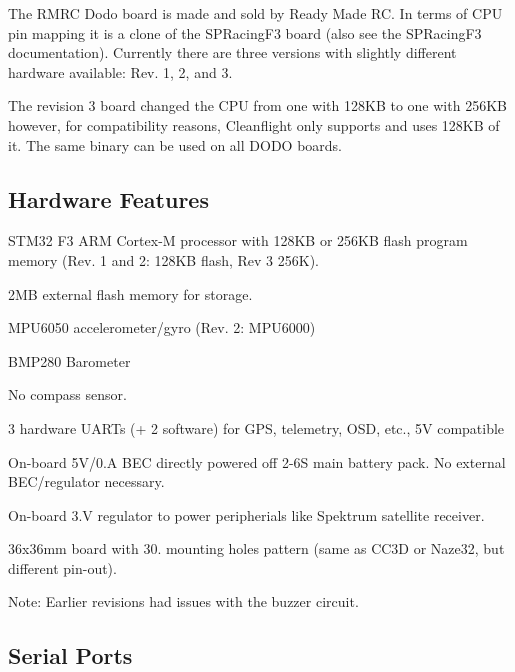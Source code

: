 The R\+M\+R\+C Dodo board is made and sold by Ready Made R\+C. In terms of C\+P\+U pin mapping it is a clone of the S\+P\+Racing\+F3 board (also see the S\+P\+Racing\+F3 documentation). Currently there are three versions with slightly different hardware available\+: Rev. 1, 2, and 3.

The revision 3 board changed the C\+P\+U from one with 128\+K\+B to one with 256\+K\+B however, for compatibility reasons, Cleanflight only supports and uses 128\+K\+B of it. The same binary can be used on all D\+O\+D\+O boards.

\subsection*{Hardware Features}


\begin{DoxyItemize}
\item S\+T\+M32 F3 A\+R\+M Cortex-\/\+M processor with 128\+K\+B or 256\+K\+B flash program memory (Rev. 1 and 2\+: 128\+K\+B flash, Rev 3 256\+K).
\item 2\+M\+B external flash memory for storage.
\item M\+P\+U6050 accelerometer/gyro (Rev. 2\+: M\+P\+U6000)
\item B\+M\+P280 Barometer
\item No compass sensor.
\item 3 hardware U\+A\+R\+Ts (+ 2 software) for G\+P\+S, telemetry, O\+S\+D, etc., 5\+V compatible
\item On-\/board 5\+V/0.\+A B\+E\+C directly powered off 2-\/6\+S main battery pack. No external B\+E\+C/regulator necessary.
\item On-\/board 3.\+V regulator to power peripherials like Spektrum satellite receiver.
\item 36x36mm board with 30.\+5mm mounting holes pattern (same as C\+C3\+D or Naze32, but different pin-\/out).
\end{DoxyItemize}

Note\+: Earlier revisions had issues with the buzzer circuit.

\subsection*{Serial Ports}


